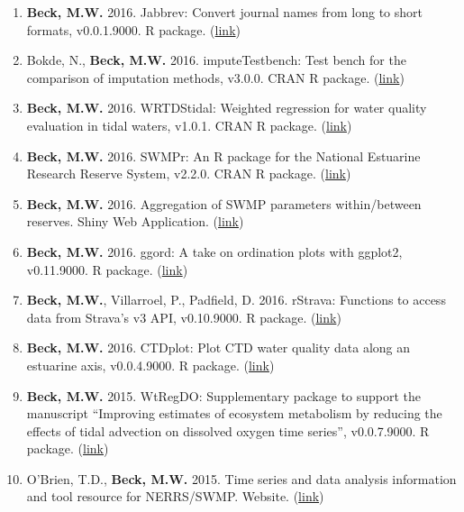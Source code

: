 \documentclass[letterpaper,12pt]{article}
\begin{document}
\begin{enumerate}

\item \textbf{Beck, M.W.} 2016. Jabbrev: Convert journal names from long to short formats, v0.0.1.9000. R package. (\href{https://github.com/fawda123/Jabbrev}{link})

\item Bokde, N., \textbf{Beck, M.W.} 2016. imputeTestbench: Test bench for the comparison of imputation methods, v3.0.0. CRAN R package. (\href{https://cran.r-project.org/web/packages/imputeTestbench/index.html}{link})

\item \textbf{Beck, M.W.} 2016. WRTDStidal: Weighted regression for water quality evaluation in tidal waters, v1.0.1. CRAN R package. (\href{https://cran.r-project.org/web/packages/WRTDStidal/index.html}{link})

\item \textbf{Beck, M.W.} 2016. SWMPr: An R package for the National Estuarine Research Reserve System, v2.2.0. CRAN R package. (\href{https://cran.r-project.org/web/packages/SWMPr/index.html}{link})

\item \textbf{Beck, M.W.} 2016. Aggregation of SWMP parameters within/between reserves. Shiny Web Application. (\href{
http://beckmw.shinyapps.io/swmp_agg}{link})

\item \textbf{Beck, M.W.} 2016. ggord: A take on ordination plots with ggplot2, v0.11.9000. R package. (\href{https://github.com/fawda123/ggord}{link})

\item \textbf{Beck, M.W.}, Villarroel, P., Padfield, D. 2016. rStrava: Functions to access data from Strava's v3 API, v0.10.9000. R package. (\href{https://github.com/fawda123/rStrava}{link})

\item \textbf{Beck, M.W.} 2016. CTDplot: Plot CTD water quality data along an estuarine axis, v0.0.4.9000. R package. (\href{https://github.com/fawda123/CTDplot}{link})

\item \textbf{Beck, M.W.} 2015. WtRegDO: Supplementary package to support the manuscript ``Improving estimates of ecosystem metabolism by reducing the effects of tidal advection on dissolved oxygen time series'', v0.0.7.9000. R package. (\href{http://github.com/fawda123/WtRegDO}{link})

\item O'Brien, T.D., \textbf{Beck, M.W.} 2015. Time series and data analysis information and tool resource for NERRS/SWMP. Website. (\href{http://swmprats.net/}{link})


\end{enumerate}
\end{document}
